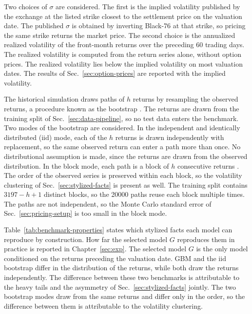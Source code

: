 Two choices of $\sigma$ are considered. The first is the implied volatility published by the exchange at the listed strike closest to the settlement price on the valuation date. The published $\sigma$ is obtained by inverting Black-76 at that strike, so pricing the same strike returns the market price. The second choice is the annualized realized volatility of the front-month returns over the preceding \num{60} trading days. The realized volatility is computed from the return series alone, without option prices. The realized volatility lies below the implied volatility on most valuation dates. The results of Sec.~\ref{sec:option-prices} are reported with the implied volatility.

The historical simulation draws paths of $h$ returns by resampling the observed returns, a procedure known as the bootstrap \parencite{efronBootstrapMethodsAnother1979}. The returns are drawn from the training split of Sec.~\ref{sec:data-pipeline}, so no test data enters the benchmark. Two modes of the bootstrap are considered. In the independent and identically distributed ($\mathrm{iid}$) mode, each of the $h$ returns is drawn independently with replacement, so the same observed return can enter a path more than once. No distributional assumption is made, since the returns are drawn from the observed distribution. In the block mode, each path is a block of $h$ consecutive returns \parencite{kunschJackknifeBootstrapGeneral1989}. The order of the observed series is preserved within each block, so the volatility clustering of Sec.~\ref{sec:stylized-facts} is present as well. The training split contains $\num{3197} - h + 1$ distinct blocks, so the \num{20000} paths reuse each block multiple times. The paths are not independent, so the Monte Carlo standard error of Sec.~\ref{sec:pricing-setup} is too small in the block mode. 

Table~\ref{tab:benchmark-properties} states which stylized facts each model can reproduce by construction. How far the selected model $G$ reproduces them in practice is reported in Chapter~\ref{sec:exp}. The selected model $G$ is the only model conditioned on the returns preceding the valuation date. GBM and the $\mathrm{iid}$ bootstrap differ in the distribution of the returns, while both draw the returns independently. The difference between these two benchmarks is attributable to the heavy tails and the asymmetry of Sec.~\ref{sec:stylized-facts} jointly. The two bootstrap modes draw from the same returns and differ only in the order, so the difference between them is attributable to the volatility clustering.

